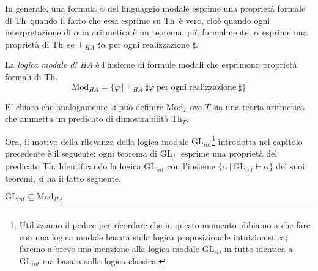 In generale, una formula $\alpha$ del linguaggio modale esprime una proprietà formale di \ensuremath{\mathrm{Th}}\ quando il fatto che essa esprime su \ensuremath{\mathrm{Th}}\ è vero, cioè quando ogni interpretazione di $\alpha$ in aritmetica è un teorema; più formalmente, $\alpha$ esprime una proprietà di \ensuremath{\mathrm{Th}}\ se $\vdash_{HA}\sharp\alpha$ per ogni realizzazione $\sharp$.

\begin{defi} La \emph{logica modale di HA} è l'insieme di formule modali che esprimono proprietà formali di \ensuremath{\mathrm{Th}}.
$$\mathrm{Mod}_{HA}=\{\varphi\,|\,\vdash_{HA}\sharp\varphi\mathrm{\; per \; ogni \; realizzazione \; \sharp}\}$$
\end{defi}

\noindent E' chiaro che analogamente si può definire $\mathrm{Mod}_{T}$ ove $T$ sia una teoria aritmetica che ammetta un predicato di dimostrabilità $\ensuremath{\mathrm{Th}}_{T}$.

Ora, il motivo della rilevanza della logica modale $\ensuremath{\mathrm{GL}}_{int}$\footnote{Utilizziamo il pedice per ricordare che in questo momento abbiamo a che fare con una logica modale basata sulla logica proposizionale intuizionistica; faremo a breve una menzione alla logica modale $\ensuremath{\mathrm{GL}}_{cl}$, in tutto identica a $\ensuremath{\mathrm{GL}}_{int}$ ma basata sulla logica classica.} introdotta nel capitolo precedente è il seguente: ogni teorema di \ensuremath{\mathrm{GL}_{\int}}\ esprime una proprietà del predicato \ensuremath{\mathrm{Th}}. Identificando la logica $\ensuremath{\mathrm{GL}}_{int}$ con l'insieme $\{\alpha\,|\,\ensuremath{\mathrm{GL}}_{int}\vdash\alpha\}$ dei suoi teoremi, si ha il fatto seguente.

\begin{prop}
$\ensuremath{\mathrm{GL}}_{int}\subseteq\mathrm{Mod}_{HA}$
\end{prop}

